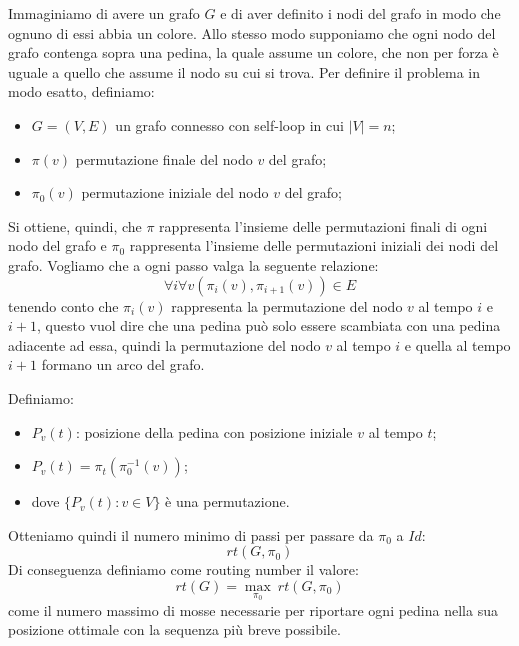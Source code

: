 Immaginiamo di avere un grafo $G$ e di aver definito i nodi del grafo in modo che ognuno di essi abbia un colore. 
Allo stesso modo supponiamo che ogni nodo del grafo contenga sopra una pedina, la quale assume un colore, che non per forza è uguale a quello che assume il nodo su cui si trova. 
Per definire il problema in modo esatto, definiamo: 
\begin{itemize}
    \item $G=(V,E)$ un grafo connesso con self-loop in cui $|V|=n$;
    \item $\pi(v)$ permutazione finale del nodo $v$ del grafo;
    \item $\pi_0(v)$ permutazione iniziale del nodo $v$ del grafo;
\end{itemize}
Si ottiene, quindi, che $\pi$ rappresenta l'insieme delle permutazioni finali di ogni nodo del grafo e $\pi_0$ rappresenta l'insieme delle permutazioni iniziali dei nodi del grafo. Vogliamo che a ogni passo valga la seguente relazione:
$$
\forall i \forall v (\pi_i(v), \pi_{i+1}(v)) \in E
$$
tenendo conto che $\pi_i(v)$ rappresenta la permutazione del nodo $v$ al tempo $i$ e $i+1$, questo vuol dire che una pedina può solo essere scambiata con una pedina adiacente ad essa, quindi la permutazione del nodo $v$ al tempo $i$ e quella al tempo $i+1$ formano un arco del grafo.

Definiamo: 
\begin{itemize}
    \item $P_v(t)$: posizione della pedina con posizione iniziale $v$ al tempo $t$; 
    \item $P_v(t) = \pi_t(\pi_0^{-1}(v))$; 
    \item dove $\{P_v(t): v \in V \}$ è una permutazione.
\end{itemize} Otteniamo quindi il numero minimo di passi per passare da $\pi_0$ a $Id$:
$$
rt(G,\pi_0)
$$
Di conseguenza definiamo come routing number il valore:
$$
rt(G) = \underset{\pi_0}{\max} \ rt(G, \pi_0)
$$
come il numero massimo di mosse necessarie per riportare ogni pedina nella sua posizione ottimale con la sequenza più breve possibile.